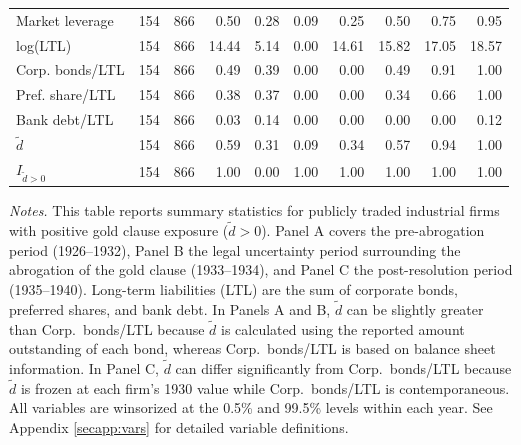 \begin{table}[p]
\begin{threeparttable}
\begin{tabular}{lrrrrrrrrr}
            Market leverage & 154 & 866 & 0.50 & 0.28 & 0.09 & 0.25 & 0.50 & 0.75 & 0.95 \\
            log(LTL) & 154 & 866 & 14.44 & 5.14 & 0.00 & 14.61 & 15.82 & 17.05 & 18.57 \\
            Corp. bonds/LTL & 154 & 866 & 0.49 & 0.39 & 0.00 & 0.00 & 0.49 & 0.91 & 1.00 \\
            Pref. share/LTL & 154 & 866 & 0.38 & 0.37 & 0.00 & 0.00 & 0.34 & 0.66 & 1.00 \\
            Bank debt/LTL & 154 & 866 & 0.03 & 0.14 & 0.00 & 0.00 & 0.00 & 0.00 & 0.12 \\
            \ensuremath{\tilde{d}} & 154 & 866 & 0.59 & 0.31 & 0.09 & 0.34 & 0.57 & 0.94 & 1.00 \\
            \ensuremath{I_{\tilde{d}>0}} & 154 & 866 & 1.00 & 0.00 & 1.00 & 1.00 & 1.00 & 1.00 & 1.00 \\
            \bottomrule
        \end{tabular}
    \end{threeparttable}

    \vspace*{3mm} \justifying \noindent
\scriptsize{\textit{Notes.} This table reports summary statistics for publicly traded industrial firms with positive gold clause exposure ($\tilde{d} > 0$). Panel A covers the pre-abrogation period (1926--1932), Panel B the legal uncertainty period surrounding the abrogation of the gold clause (1933--1934), and Panel C the post-resolution period (1935--1940). Long-term liabilities (LTL) are the sum of corporate bonds, preferred shares, and bank debt. In Panels A and B, $\tilde{d}$ can be slightly greater than Corp.\ bonds/LTL because $\tilde{d}$ is calculated using the reported amount outstanding of each bond, whereas Corp.\ bonds/LTL is based on balance sheet information. In Panel C, $\tilde{d}$ can differ significantly from Corp.\ bonds/LTL because $\tilde{d}$ is frozen at each firm's 1930 value while Corp.\ bonds/LTL is contemporaneous. All variables are winsorized at the 0.5\% and 99.5\% levels within each year. See Appendix \ref{secapp:vars} for detailed variable definitions.}
\end{table}